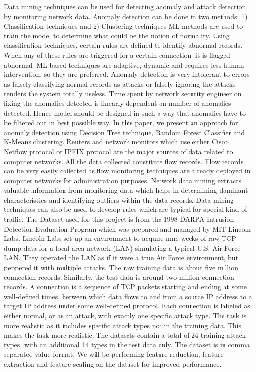 \documentclass{acm_proc_article-sp}
\begin{document}
Data mining techniques can be used for detecting anomaly and attack detection by monitoring network data. Anomaly detection can be done in two methods: 1) Classification techniques and 2) Clustering techniques
ML methods are used to train the model to determine what could be the notion of normality. Using classification techniques, certain rules are defined to identify abnormal records. When any of these rules are triggered for a certain connection, it is flagged abnormal. ML based techniques are adaptive, dynamic and requires less human intervention, so they are preferred. Anomaly detection is very intolerant to errors as falsely classifying normal records as attacks or falsely ignoring the attacks renders the system totally useless. Time spent by network security engineer on fixing the anomalies detected is linearly dependent on number of anomalies detected. Hence model should be designed in such a way that anomalies have to be filtered out in best possible way. In this paper, we present an approach for anomaly detection using Decision Tree technique, Random Forest Classifier and K-Means clustering.
Reuters and network monitors which use either Cisco Netflow protocol or IPFIX protocol are the major sources of data related to computer networks. All the data collected constitute flow records. Flow records can be very easily collected as flow monitoring techniques are already deployed in computer networks for administration purposes. Network data mining extracts valuable information from monitoring data which helps in determining dominant characteristics and identifying outliers within the data records. Data mining techniques can also be used to develop rules which are typical for special kind of traffic.
The Dataset used for this project is from the 1998 DARPA Intrusion Detection Evaluation Program which was prepared and managed by MIT Lincoln Labs. Lincoln Labs set up an environment to acquire nine weeks of raw TCP dump data for a local-area network (LAN) simulating a typical U.S. Air Force LAN.  They operated the LAN as if it were a true Air Force environment, but peppered it with multiple attacks. The raw training data is about five million connection records.  Similarly, the test data is around two million connection records. A connection is a sequence of TCP packets starting and ending at some well-defined times, between which data flows to and from a source IP address to a target IP address under some well-defined protocol.  Each connection is labeled as either normal, or as an attack, with exactly one specific attack type. The task is more realistic as it includes specific attack types not in the training data.  This makes the task more realistic. The datasets contain a total of 24 training attack types, with an additional 14 types in the test data only. The dataset is in comma separated value format. We will be performing feature reduction, feature extraction and feature scaling on the dataset for improved performance.
~\cite{www-iacr}
~\cite{www-sciencedirect}
~\cite{www-wikipedia}
~\cite{www-wiki}
~\cite{www-ics-uci}
\end{document}
